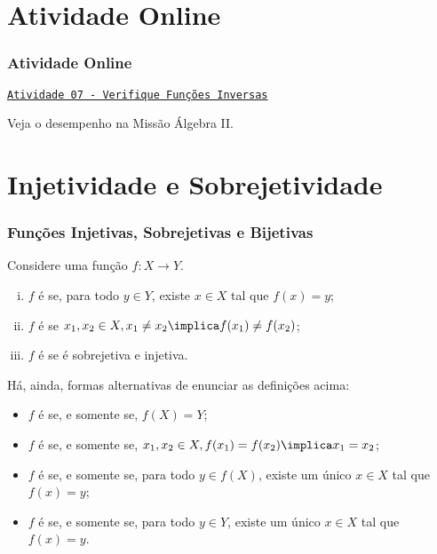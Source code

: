 \documentclass[10pt]{beamer}
\begin{document}
\section{Atividade Online}
\begin{frame}
\frametitle{Atividade Online} 

\href{https://pt.khanacademy.org/math/algebra2/manipulating-functions/verifying-that-functions-are-inverses/e/inverses_of_functions}
{{\tt Atividade 07 - Verifique Funções Inversas}}


Veja o desempenho na Missão Álgebra II.


\end{frame}
\section{Injetividade e Sobrejetividade}
\begin{frame}
\frametitle{Funções Injetivas, Sobrejetivas e Bijetivas} 


\begin{definicao}
Considere uma função $f: X \to Y$.
\begin{enumerate}[(i)]
	\item $f$ é  se, para todo $y \in Y$, existe $x
	\in X$ tal que $f(x) = y$;
	\item $f$ é  se $x_1, x_2 \in X, x_1 \neq x_2
	\implica f(x_1) \neq f(x_2)$;
	\item $f$ é  se é sobrejetiva e injetiva.
\end{enumerate}
\end{definicao}\pause
Há, ainda, formas alternativas de enunciar as definições acima:
\begin{itemize}
	\item $f$ é  se, e somente se, $f(X) = Y$;
	\item $f$ é  se, e somente se, $x_1, x_2 \in X, f(x_1) = f(x_2)
	\implica x_1 = x_2 $;
	\item $f$ é  se, e somente se, para todo $y \in
	f(X)$, existe um único $x \in X$ tal que $f(x) = y$;
	\item $f$ é  se, e somente se, para todo $y \in Y$,
	existe um único $x \in X$ tal que $f(x) = y$.
\end{itemize}
\end{frame}
\end{document}
